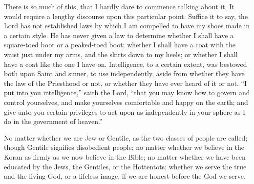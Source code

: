 					There is so much of this, that I hardly dare to commence talking about it. It would require a lengthy discourse upon this particular point. Suffice it to say, the Lord has not established laws by which I am compelled to have my shoes made in a certain style. He has never given a law to determine whether I shall have a square-toed boot or a peaked-toed boot; whether I shall have a coat with the waist just under my arms, and the skirts down to my heels; or whether I shall have a coat like the one I have on. Intelligence, to a certain extent, was bestowed both upon Saint and sinner, to use independently, aside from whether they have the law of the Priesthood or not, or whether they have ever heard of it or not. ``I put into you intelligence,'' saith the Lord, ``that you may know how to govern and control yourselves, and make yourselves comfortable and happy on the earth; and give unto you certain privileges to act upon as independently in your sphere as I do in the government of heaven.''
					
					No matter whether we are Jew or Gentile, as the two classes of people are called; though Gentile signifies disobedient people; no matter whether we believe in the Koran as firmly as we now believe in the Bible; no matter whether we have been educated by the Jews, the Gentiles, or the Hottentots; whether we serve the true and the living God, or a lifeless image, if we are honest before the God we serve.